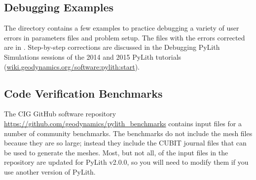 \subsection{Debugging Examples}
\label{sub:debugging:examples}

The directory  contains a few examples to
practice debugging a variety of user errors in parameters files and
problem setup. The files with the errors corrected are in
.  Step-by-step corrections are
discussed in the Debugging PyLith Simulations sessions of the 2014 and
2015 PyLith tutorials
(\url{wiki.geodynamics.org/software:pylith:start}).


\subsection{Code Verification Benchmarks}

The CIG GitHub software repository \url{https://github.com/geodynamics/pylith_benchmarks}
contains input files for a number of community benchmarks. The benchmarks
do not include the mesh files because they are so large; instead they
include the CUBIT journal files that can be used to generate the meshes.
Most, but not all, of the input files in the repository are updated
for PyLith v2.0.0, so you will need to modify them if you use another
version of PyLith.

